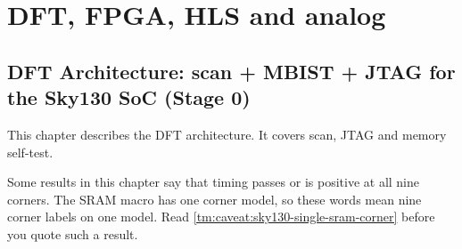 \part{DFT, FPGA, HLS and analog}\label{tm:part:dft-fpga-hls-and-analog}

\chapter{DFT Architecture: scan + MBIST + JTAG for the Sky130 SoC (Stage
0)}\label{tm:ch:dft-architecture}

This chapter describes the DFT architecture. It covers scan, JTAG and memory self-test.

\begin{information}
Some results in this chapter say that timing passes or is positive at all nine corners. The SRAM macro has one corner model, so these words mean nine corner labels on one model. Read \cref{tm:caveat:sky130-single-sram-corner} before you quote such a result.
\end{information}

